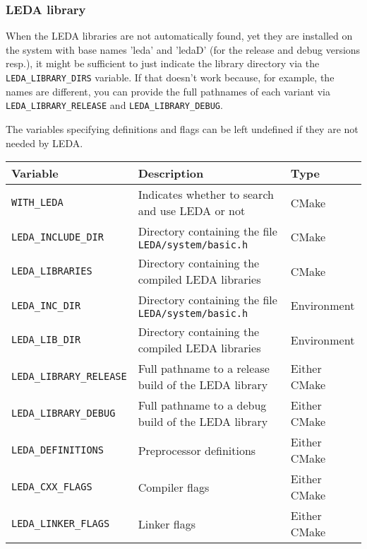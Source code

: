 \subsubsection{LEDA library}

When the LEDA libraries are not automatically found, yet they are installed on the system
with base names 'leda' and 'ledaD' (for the release and debug versions resp.), it might 
be sufficient to just indicate the library directory via the \texttt{LEDA\_LIBRARY\_DIRS} variable.
If that doesn't work because, for example, the names are different, you can provide the full pathnames of each variant
via \texttt{LEDA\_LIBRARY\_RELEASE} and \texttt{LEDA\_LIBRARY\_DEBUG}.

The variables specifying definitions and flags can be left undefined if they are not needed by LEDA.

{\ccTexHtml{\small}{}
\renewcommand{\arraystretch}{1.3}
\gdef\lcTabularBorder{2}
\begin{tabular}{|l|l|l|} \hline
  \textbf{Variable}               & \textbf{Description}                                       & \textbf{Type}\\\hline\hline
  \texttt{WITH\_LEDA}             & Indicates whether to search and use LEDA or not            & CMake\\\hline
  \texttt{LEDA\_INCLUDE\_DIR}     & Directory containing the file \texttt{LEDA/system/basic.h} & CMake\\\hline
  \texttt{LEDA\_LIBRARIES}        & Directory containing the compiled LEDA libraries           & CMake\\\hline
  \texttt{LEDA\_INC\_DIR}         & Directory containing the file \texttt{LEDA/system/basic.h} & Environment\\\hline
  \texttt{LEDA\_LIB\_DIR}         & Directory containing the compiled LEDA libraries           & Environment\\\hline
  \texttt{LEDA\_LIBRARY\_RELEASE} & Full pathname to a release build of the LEDA library       & Either CMake\\\hline
  \texttt{LEDA\_LIBRARY\_DEBUG}   & Full pathname to a debug build of the LEDA library         & Either CMake\\\hline
  \texttt{LEDA\_DEFINITIONS}      & Preprocessor definitions                                   & Either CMake\\\hline
  \texttt{LEDA\_CXX\_FLAGS}       & Compiler flags                                             & Either CMake\\\hline
  \texttt{LEDA\_LINKER\_FLAGS}    & Linker flags                                               & Either CMake\\\hline
\end{tabular}
}


